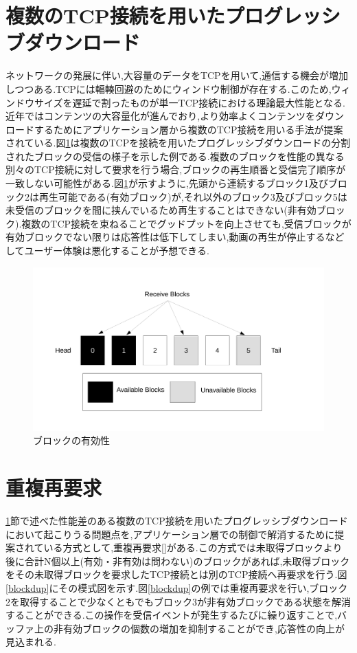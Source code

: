 \documentclass[a4j,12pt]{gradthesis_utf8}
\begin{document}
 \section{複数のTCP接続を用いたプログレッシブダウンロード}
 \label{hukusu}
 ネットワークの発展に伴い,大容量のデータをTCPを用いて,通信する機会が増加しつつある.TCPには輻輳回避のためにウィンドウ制御が存在する.このため,ウィンドウサイズを遅延で割ったものが単一TCP接続における理論最大性能となる.近年ではコンテンツの大容量化が進んでおり,より効率よくコンテンツをダウンロードするためにアプリケーション層から複数のTCP接続を用いる手法が提案されている.図\ref{block}は複数のTCPを接続を用いたプログレッシブダウンロードの分割されたブロックの受信の様子を示した例である.複数のブロックを性能の異なる別々のTCP接続に対して要求を行う場合,ブロックの再生順番と受信完了順序が一致しない可能性がある.図\ref{block}が示すように,先頭から連続するブロック1及びブロック2は再生可能である(有効ブロック)が,それ以外のブロック3及びブロック5は未受信のブロックを間に挟んでいるため再生することはできない(非有効ブロック).複数のTCP接続を束ねることでグッドプットを向上させても,受信ブロックが有効ブロックでない限りは応答性は低下してしまい,動画の再生が停止するなどしてユーザー体験は悪化することが予想できる.
\begin{figure}[h]
\centering
\includegraphics[width=18cm]{block.pdf}
\caption{ブロックの有効性}
\label{block}
\end{figure}

 \section{重複再要求}
 \label{juhuku}
 \ref{hukusu}節で述べた性能差のある複数のTCP接続を用いたプログレッシブダウンロードにおいて起こりうる問題点を,アプリケーション層での制御で解消するために提案されている方式として,重複再要求[]がある.この方式では未取得ブロックより後に合計N個以上(有効・非有効は問わない)のブロックがあれば,未取得ブロックをその未取得ブロックを要求したTCP接続とは別のTCP接続へ再要求を行う.図\ref{blockdup}にその模式図を示す.図\ref{blockdup}の例では重複再要求を行い,ブロック2を取得することで少なくともでもブロック3が非有効ブロックである状態を解消することができる.この操作を受信イベントが発生するたびに繰り返すことで,バッファ上の非有効ブロックの個数の増加を抑制することができ,応答性の向上が見込まれる.
 
\end{document}
